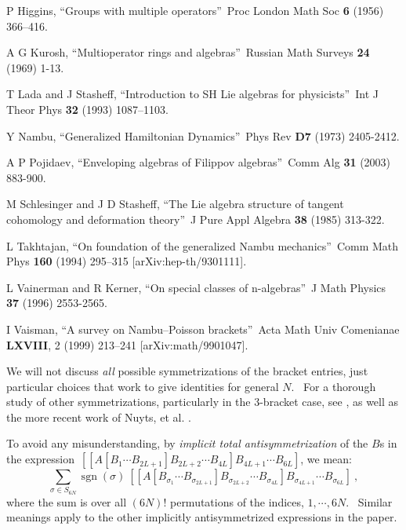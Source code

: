\documentclass[aps,preprint,tightenlines,unsortedaddress,11pt]{revtex4}\usepackage{amsfonts}
\begin{document}
\begin{thebibliography}{99}
P Higgins, \textquotedblleft Groups with multiple
operators\textquotedblright\ Proc London Math Soc \textbf{6} (1956) 366--416.

A G Kurosh, \textquotedblleft Multioperator rings and
algebras\textquotedblright\ Russian Math Surveys \textbf{24} (1969) 1-13.

T Lada and J Stasheff, \textquotedblleft Introduction to SH Lie
algebras for physicists\textquotedblright\ Int J Theor Phys \textbf{32} (1993) 1087--1103.

Y Nambu, \textquotedblleft Generalized Hamiltonian
Dynamics\textquotedblright\ Phys Rev \textbf{D7} (1973) 2405-2412.


A P Pojidaev, \textquotedblleft Enveloping algebras of
Filippov algebras\textquotedblright\ Comm Alg \textbf{31} (2003) 883-900.

M Schlesinger and J D Stasheff, \textquotedblleft The
Lie algebra structure of tangent cohomology and deformation
theory\textquotedblright\ J Pure Appl Algebra \textbf{38} (1985) 313-322.

L Takhtajan, \textquotedblleft On foundation of the
generalized Nambu mechanics\textquotedblright\ Comm Math Phys \textbf{160}
(1994) 295--315 [arXiv:hep-th/9301111].

L Vainerman and R Kerner, \textquotedblleft On special
classes of n-algebras\textquotedblright\ J Math Physics \textbf{37} (1996) 2553-2565.

I Vaisman, \textquotedblleft A survey on Nambu--Poisson
brackets\textquotedblright\ Acta Math Univ Comenianae \textbf{LXVIII}, 2
(1999) 213--241 [arXiv:math/9901047].

We will not discuss \emph{all} possible symmetrizations of
the bracket entries, just particular choices that work to give identities for
general $N$. \ For a thorough study of other symmetrizations, particularly in
the $3$-bracket case, see \cite{Bremner}, as well as the more recent work of
Nuyts, et al. \cite{Devchand}.

To avoid any misunderstanding, by \emph{implicit total
antisymmetrization} of the $B$s in the expression\ $\left[  \left[  A\left[
B_{1}\cdots B_{2L+1}\right]  B_{2L+2}\cdots B_{4L}\right]  B_{4L+1}\cdots
B_{6L}\right]  $, we mean: \
\[
\sum_{\sigma\in S_{6N}}\operatorname*{sgn}\left(  \sigma\right)  ~\left[
\left[  A\left[  B_{\sigma_{1}}\cdots B_{\sigma_{2L+1}}\right]  B_{\sigma
_{2L+2}}\cdots B_{\sigma_{4L}}\right]  B_{\sigma_{4L+1}}\cdots B_{\sigma_{6L}}\right]  \ ,
\]
where the sum is over all $\left(  6N\right)  !$ permutations of the indices,
$1,\cdots,6N$. \ Similar meanings apply to the other implicitly
antisymmetrized expressions in the paper.
\end{thebibliography}
\end{document}
